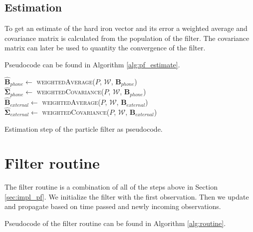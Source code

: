 \subsection{Estimation}

To get an estimate of the hard iron vector and its error a weighted average and covariance matrix is calculated from the population of the filter. The covariance matrix can later be used to quantity the convergence of the filter.

Pseudocode can be found in Algorithm \ref{alg:pf_estimate}.

\begin{algorithm}[h]
    $\bm{\hat{B}}_{phone} \leftarrow$ \textsc{weightedAverage($P$, $\mathcal{W}$, $\bm{B}_{phone}$)}\\
    $\bm{\hat{\Sigma}}_{phone} \leftarrow$ \textsc{weightedCovariance($P$, $\mathcal{W}$, $\bm{B}_{phone}$)}\\
    $\bm{\hat{B}}_{external} \leftarrow$ \textsc{weightedAverage($P$, $\mathcal{W}$, $\bm{B}_{external}$)}\\
    $\bm{\hat{\Sigma}}_{external} \leftarrow$ \textsc{weightedCovariance($P$, $\mathcal{W}$, $\bm{B}_{external}$)}\\
	\caption{Estimation step of the particle filter as pseudocode.}
	\label{alg:pf_estimate}
\end{algorithm}

\section{Filter routine}

The filter routine is a combination of all of the steps above in Section \ref{sec:impl_pf}. We initialize the filter with the first observation. Then we update and propagate based on time passed and newly incoming observations.

Pseudocode of the filter routine can be found in Algorithm \ref{alg:routine}.

